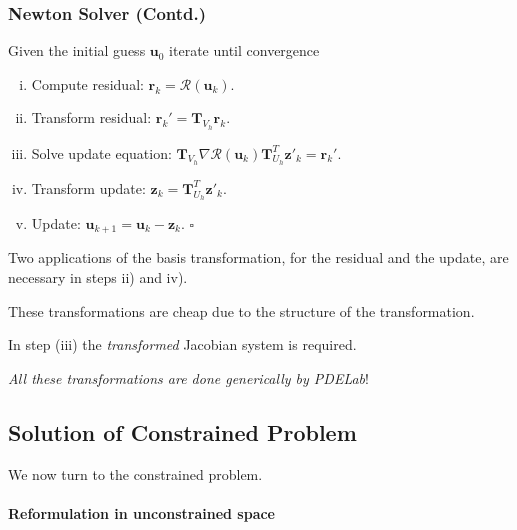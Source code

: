 \begin{frame}
\frametitle<presentation>{Newton Solver (Contd.)}
\begin{Alg}
Given the initial guess $\mathbf{u}_{0}$ iterate until convergence
\begin{enumerate}[i)]
\item Compute residual:
  $\mathbf{r}_k=\mathcal{R}\left(\mathbf{u}_{k}\right)$.
\item Transform residual: $\mathbf{r}_k' = \mathbf{T}_{V_h}
  \mathbf{r}_k$.
\item Solve update equation:
  $\mathbf{T}_{V_h}\nabla\mathcal{R}\left(\mathbf{u}_{k}\right)  
\mathbf{T}^T_{U_h} \mathbf{z}'_{k} =  \mathbf{r}_k'$.
\item Transform update: $\mathbf{z}_{k} =
  \mathbf{T}^T_{U_h}\mathbf{z}'_k$.
\item Update: $\mathbf{u}_{k+1} = \mathbf{u}_k
- \mathbf{z}_k$. \hfill$\square$
\end{enumerate}
\end{Alg}

Two applications of the basis transformation, for the
residual and the update, are necessary in steps ii) and iv).

These transformations are cheap due to the structure of the
transformation.

In step (iii) the \textit{transformed}
Jacobian system is required.

\textit{All these transformations are done generically by PDELab}!
\end{frame}

\subsection{Solution of Constrained Problem}

We now turn to the constrained problem.

\paragraph{Reformulation in unconstrained space}

